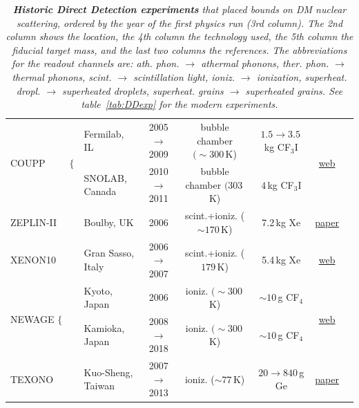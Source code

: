 \begin{table}
{\begin{tabular}{llccccc}
\multirow{2}{*}{{\sc COUPP}~~~~~$\biggr\{$} & Fermilab, IL & 2005 $\to$ 2009 &   bubble chamber $(\sim300\,$K) & $1.5\to3.5\,$kg CF${}_3$I & \multirow{2}{*}{\href{https://web.archive.org/web/20210318000115/https://www-coupp.fnal.gov/}{web}} & \multirow{2}{*}{\cite{COUPP}} \\

 & SNOLAB, Canada & 2010 $\to$ 2011 &  bubble chamber $(303\,$K) & $4\,$kg CF${}_3$I  &  &  \\

{\sc ZEPLIN-II} & Boulby, UK & 2006 &  scint.+ioniz. ($\sim170\,$K) & 7.2\,kg Xe & \href{https://doi.org/10.1016/j.nima.2007.11.005}{paper} & \cite{ZEPLIN-II} \\

{\sc XENON10} & Gran Sasso, Italy & 2006 $\to$ 2007 & scint.+ioniz. ($179\,$K)  & 5.4\,kg Xe& \href{http://xenon.astro.columbia.edu/XENON10_Experiment/}{web} & \cite{XENON10}
\\
 
\multirow{2}{*}{{\sc NEWAGE} $\Big\{$} &  Kyoto, Japan & 2006 &  ioniz. $(\sim300\,$K)  & $\sim10\,$g CF${}_4$ & \multirow{2}{*}{\href{http://ppwww.phys.sci.kobe-u.ac.jp/~newage/newage_e.htm}{web}} & \multirow{2}{*}{\cite{NEWAGE}}\\

 &  Kamioka, Japan & 2008 $\to$ 2018 &  ioniz. $(\sim300\,$K)  & $\sim10\,$g CF${}_4$ &  &  \\

{\sc TEXONO} & Kuo-Sheng, Taiwan & 2007 $\to$ 2013 &  ioniz. ($\sim77$\,K) &  $20\to840\,$g Ge & \href{https://doi.org/10.1103/PhysRevLett.110.261301}{paper} & \cite{TEXONO}
\\


\hline\hline
\end{tabular}}
\caption[Historic direct detection experiments]{\em {\bfseries Historic Direct Detection experiments} that placed bounds on DM nuclear scattering, ordered by the year of the first physics run (3rd column). The 2nd column shows the location, 
the 4th column the technology used, the 5th column the fiducial target mass, and the last two columns the references. 
The abbreviations for the readout channels are: ath. phon. $\to$ athermal phonons, ther. phon. $\to$ thermal phonons,  scint. $\to$ scintillation light, ioniz. $\to$ ionization, superheat. dropl. $\to$ superheated droplets, superheat. grains $\to$ superheated grains.
See table~\ref{tab:DDexp} for the modern experiments. 
\label{tab:DDexp:hist}}
\end{table}


